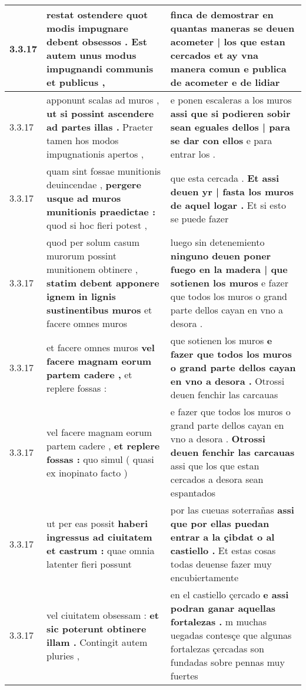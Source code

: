 \begin{tabular}{|p{1cm}|p{6.5cm}|p{6.5cm}|}
3.3.17 & restat ostendere \textbf{ quot modis impugnare debent obsessos . } Est autem unus modus impugnandi communis et publicus , & finca de demostrar \textbf{ en quantas maneras se deuen acometer | los que estan cercados } et ay vna manera comun e publica de acometer e de lidiar \\\hline
3.3.17 & apponunt scalas ad muros , \textbf{ ut si possint ascendere ad partes illas . } Praeter tamen hos modos impugnationis apertos , & e ponen escaleras a los muros \textbf{ assi que si podieren sobir sean eguales dellos | para se dar con ellos } e para entrar los . \\\hline
3.3.17 & quam sint fossae munitionis deuincendae , \textbf{ pergere usque ad muros munitionis praedictae : } quod si hoc fieri potest , & que esta cercada . \textbf{ Et assi deuen yr | fasta los muros de aquel logar . } Et si esto se puede fazer \\\hline
3.3.17 & quod per solum casum murorum possint munitionem obtinere , \textbf{ statim debent apponere ignem in lignis sustinentibus muros } et facere omnes muros & luego sin detenemiento \textbf{ ninguno deuen poner fuego en la madera | que sotienen los muros } e fazer que todos los muros o grand parte dellos cayan en vno a desora . \\\hline
3.3.17 & et facere omnes muros \textbf{ vel facere magnam eorum partem cadere , } et replere fossas : & que sotienen los muros \textbf{ e fazer que todos los muros o grand parte dellos cayan en vno a desora . } Otrossi deuen fenchir las carcauas \\\hline
3.3.17 & vel facere magnam eorum partem cadere , \textbf{ et replere fossas : } quo simul ( quasi ex inopinato facto ) & e fazer que todos los muros o grand parte dellos cayan en vno a desora . \textbf{ Otrossi deuen fenchir las carcauas } assi que los que estan cercados a desora sean espantados \\\hline
3.3.17 & ut per eas possit \textbf{ haberi ingressus ad ciuitatem et castrum : } quae omnia latenter fieri possunt & por las cueuas soterrañas \textbf{ assi que por ellas puedan entrar a la çibdat o al castiello . } Et estas cosas todas deuense fazer muy encubiertamente \\\hline
3.3.17 & vel ciuitatem obsessam : \textbf{ et sic poterunt obtinere illam . } Contingit autem pluries , & en el castiello çercado \textbf{ e assi podran ganar aquellas fortalezas . } m muchas uegadas contesçe que algunas fortalezas çercadas son fundadas sobre pennas muy fuertes \\\hline

\end{tabular}
